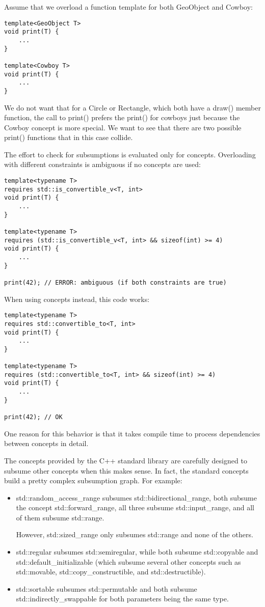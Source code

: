 Assume that we overload a function template for both GeoObject and Cowboy:

\begin{lstlisting}[style=styleCXX]
template<GeoObject T>
void print(T) {
	...
}

template<Cowboy T>
void print(T) {
	...
}
\end{lstlisting}

We do not want that for a Circle or Rectangle, which both have a draw() member function, the call to print() prefers the print() for cowboys just because the Cowboy concept is more special. We want to see that there are two possible print() functions that in this case collide.

The effort to check for subsumptions is evaluated only for concepts. Overloading with different constraints is ambiguous if no concepts are used:

\begin{lstlisting}[style=styleCXX]
template<typename T>
requires std::is_convertible_v<T, int>
void print(T) {
	...
}

template<typename T>
requires (std::is_convertible_v<T, int> && sizeof(int) >= 4)
void print(T) {
	...
}

print(42); // ERROR: ambiguous (if both constraints are true)
\end{lstlisting}

When using concepts instead, this code works:

\begin{lstlisting}[style=styleCXX]
template<typename T>
requires std::convertible_to<T, int>
void print(T) {
	...
}

template<typename T>
requires (std::convertible_to<T, int> && sizeof(int) >= 4)
void print(T) {
	...
}

print(42); // OK
\end{lstlisting}

One reason for this behavior is that it takes compile time to process dependencies between concepts in detail.

The concepts provided by the C++ standard library are carefully designed to subsume other concepts when this makes sense. In fact, the standard concepts build a pretty complex subsumption graph. For example:

\begin{itemize}
\item
std::random\_access\_range subsumes std::bidirectional\_range, both subsume the concept std::forward\_range, all three subsume std::input\_range, and all of them subsume std::range.

However, std::sized\_range only subsumes std::range and none of the others.

\item
std::regular subsumes std::semiregular, while both subsume std::copyable and std::default\_initializable (which subsume several other concepts such as std::movable, std::copy\_constructible, and std::destructible).

\item
std::sortable subsumes std::permutable and both subsume std::indirectly\_swappable for both parameters being the same type.
\end{itemize}



